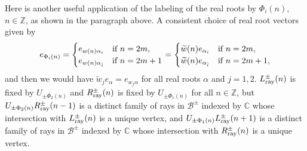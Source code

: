 \documentclass[pdftex]{sigma}
\numberwithin{equation}{section}
\def\C{{\mathbb C}}
\def\Z{\mathbb{Z}}
\def\a{\alpha}
\def\roots{{\Phi}}
\def\wtil{\widetilde w}
\def\cB{\mathcal B}
\begin{document}
Here is another useful application of the labeling of the real roots by $\roots_i(n)$, $n\in\Z$, as shown in the paragraph above.
A consistent choice of real root vectors given by
\[e_{\roots_i(n)} = \begin{cases} e_{w(n) \a_i}& \hbox{if }n = 2m, \\ e_{w(n) \a_{\hat i}}& \hbox{if }n = 2m+1\end{cases}
= \begin{cases} \wtil(n) e_{\a_i} & \hbox{if }n = 2m, \\ \wtil(n) e_{\a_{\hat i}}& \hbox{if }n = 2m+1,\end{cases}\]
and then we would have $\wtil_j e_\a = e_{w_j \a}$ for all real roots $\a$ and $j=1,2$. $L^\pm_{\rm ray}(n)$ is fixed by $U_{\pm\roots_2(n)}$ and $R^\pm_{\rm ray}(n)$ is fixed by $U_{\pm\roots_1(n)}$ for all
$n\in\Z$, but $U_{\pm\roots_2(n)} R^\pm_{\rm ray}(n-1)$ is a distinct family of rays in $\cB^\pm$ indexed by $\C$ whose intersection with $L^\pm_{\rm ray}(n)$ is a unique vertex, and
$U_{\pm\roots_1(n)} L^\pm_{\rm ray}(n+1)$ is a distinct family of rays in $\cB^\pm$ indexed by $\C$ whose intersection with $R^\pm_{\rm ray}(n)$ is a unique vertex.
\end{document}
